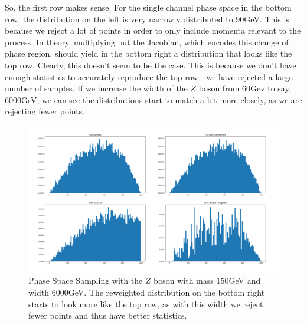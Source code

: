 So, the first row makes sense. 
For the single channel phase space in the bottom row, the distribution on the left is very narrowly distributed to 90GeV. This is because we reject a lot of points in order to only include momenta relevant to the process. In theory, multiplying but the Jacobian, which encodes this change of phase region, should yield in the bottom right a distribution that looks like the top row. Clearly, this doesn't seem to be the case. This is because we don't have enough statistics to accurately reproduce the top row - we have rejected a large number of samples. If we increase the width of the $Z$ boson from 60Gev to say, 6000GeV, we can see the distributions start to match a bit more closely, as we are rejecting fewer points.

\begin{figure}[H]
    \centering
    \includegraphics[width=0.75\linewidth]{tex/ims/phasespace2.png}
    \caption{Phase Space Sampling with the $Z$ boson with mass 150GeV and width 6000GeV. The reweighted distribution on the bottom right starts to look more like the top row, as with this width we reject fewer points and thus have better statistics.}
    \label{fig:phase2}
\end{figure}



